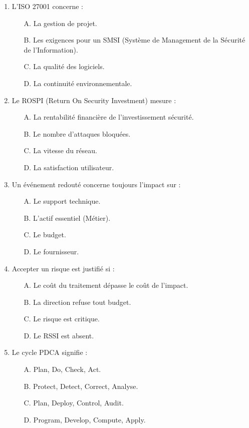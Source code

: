 \begin{enumerate}
    \item L'ISO 27001 concerne :
    \begin{itemize}
        \item[A.] La gestion de projet.
        \item[B.] Les exigences pour un SMSI (Système de Management de la Sécurité de l'Information).
        \item[C.] La qualité des logiciels.
        \item[D.] La continuité environnementale.
    \end{itemize}

    \item Le ROSPI (Return On Security Investment) mesure :
    \begin{itemize}
        \item[A.] La rentabilité financière de l'investissement sécurité.
        \item[B.] Le nombre d'attaques bloquées.
        \item[C.] La vitesse du réseau.
        \item[D.] La satisfaction utilisateur.
    \end{itemize}

    \item Un événement redouté concerne toujours l'impact sur :
    \begin{itemize}
        \item[A.] Le support technique.
        \item[B.] L'actif essentiel (Métier).
        \item[C.] Le budget.
        \item[D.] Le fournisseur.
    \end{itemize}

    \item Accepter un risque est justifié si :
    \begin{itemize}
        \item[A.] Le coût du traitement dépasse le coût de l'impact.
        \item[B.] La direction refuse tout budget.
        \item[C.] Le risque est critique.
        \item[D.] Le RSSI est absent.
    \end{itemize}

    \item Le cycle PDCA signifie :
    \begin{itemize}
        \item[A.] Plan, Do, Check, Act.
        \item[B.] Protect, Detect, Correct, Analyse.
        \item[C.] Plan, Deploy, Control, Audit.
        \item[D.] Program, Develop, Compute, Apply.
    \end{itemize}
\end{enumerate}

